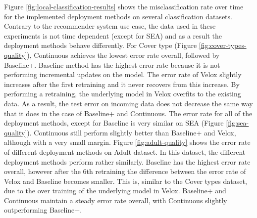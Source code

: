 \documentclass{vldb}
\begin{document}
Figure \ref{fig:local-classification-results} shows the misclassification rate over time for the implemented deployment methods on several classification datasets.
Contrary to the recommender system use case, the data used in these experiments is not time dependent (except for SEA) and as a result the deployment methods behave differently.
For Cover type (Figure \ref{fig:cover-types-quality}), Continuous achieves the lowest error rate overall, followed by Baseline+.
Baseline method has the highest error rate because it is not performing incremental updates on the model.
The error rate of Velox slightly increases after the first retraining and it never recovers from this increase.
By performing a retraining, the underlying model in Velox overfits to the existing data.
As a result, the test error on incoming data does not decrease the same way that it does in the case of Baseline+ and Continuous.
The error rate for all of the deployment methods, except for Baseline is very similar on SEA (Figure \ref{fig:sea-quality}).
Continuous still perform slightly better than Baseline+ and Velox, although with a very small margin.
Figure \ref{fig:adult-quality} shows the error rate of different deployment methods on Adult dataset.
In this dataset, the different deployment methods perform rather similarly.
Baseline has the highest error rate overall, however after the 6th retraining the difference between the error rate of Velox and Baseline becomes smaller.
This is, similar to the Cover types dataset, due to the over training of the underlying model in Velox.
Baseline+ and Continuous maintain a steady error rate overall, with Continuous slightly outperforming Baseline+.
\end{document}
